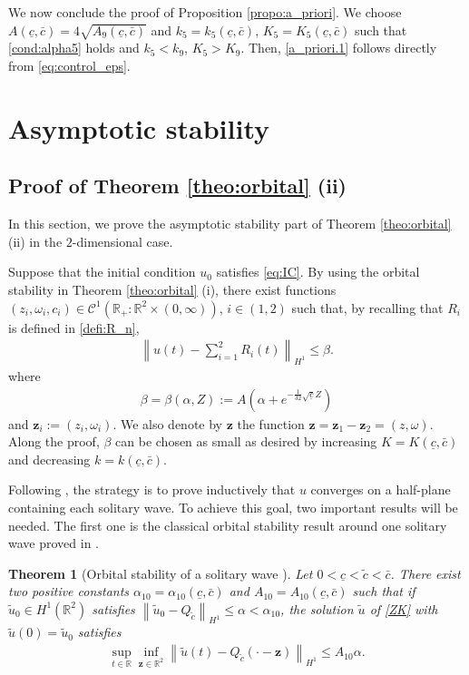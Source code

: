 \documentclass[reqno,10pt]{amsart}
\newtheorem{theo}[lemm]{Theorem}
\numberwithin{equation}{section}
\newcommand{\bz}{\mathbf{z}}
\begin{document}
	We now conclude the proof of Proposition \ref{propo:a_priori}. We choose $A(\underline{c},\bar{c})=4\sqrt{A_9(\underline{c},\bar{c})}$ and $k_5=k_5(\underline{c},\bar{c})$, $K_5=K_5(\underline{c},\bar{c})$ such that \eqref{cond:alpha5} holds and $k_5<k_9$, $K_5>K_9$. Then, \eqref{a_priori.1} follows directly from \eqref{eq:control_eps}.  
	
\section{Asymptotic stability} \label{Sec:asympt}

\subsection{Proof of Theorem \ref{theo:orbital} (ii)}

In this section, we prove the asymptotic stability part of Theorem \ref{theo:orbital} (ii) in the $2$-dimensional case. 
	
	Suppose that the initial condition $u_0$ satisfies \eqref{eq:IC}. By using the orbital stability in Theorem \ref{theo:orbital} (i), there exist functions $(z_i,\omega_i,c_i)\in \mathcal{C}^1(\mathbb{R}_+: \mathbb{R}^2 \times(0,\infty))$, $i\in (1,2)$ such that, by recalling that $R_i$ is defined in \eqref{defi:R_n},
	\begin{align} \label{bound:u(t)}
		\left\| u(t) - \sum_{i=1}^2 R_i(t) \right\|_{H^1} \leq \beta.
	\end{align}
	where
	\begin{align}\label{defi:alpha_star}
		\beta = \beta(\alpha, Z) := A \left( \alpha +e^{-\frac{1}{32} \sqrt{\underline{c}} Z}\right)
	\end{align}
 and $\bz_i := (z_i,\omega_i)$. We also denote by $\bz$ the function $\bz = \bz_1 - \bz_2 = (z,\omega)$. Along the proof, $\beta$ can be chosen as small as desired by increasing $K=K(\underline{c},\bar{c})$ and decreasing $k=k(\underline{c},\bar{c})$. 
 
Following \cite{MMT02}, the strategy is to prove inductively that $u$ converges on a half-plane containing each solitary wave. To achieve this goal, two important results will be needed. The first one is the classical orbital stability result around one solitary wave proved in \cite{deB96}. 
	
	\begin{theo}[Orbital stability of a solitary wave \cite{deB96}]\label{theo:orbital_stab}
		Let $0<\underline{c}<\tilde{c}<\bar{c}$. There exist two positive constants $\alpha_{10}=\alpha_{10}(\underline{c},\bar{c})$ and $A_{10}=A_{10}(\underline{c},\bar{c})$ such that if $\tilde{u}_0\in H^1(\mathbb{R}^2)$ satisfies $\left\| \tilde{u}_0 -Q_{\tilde{c}} \right\|_{H^1} \leq \alpha < \alpha_{10}$, the solution $ \tilde{u}$ of \ref{ZK} with $\tilde{u}(0)=\tilde{u}_0$ satisfies
		\begin{align*}
			\sup_{t \in \mathbb{R}} \inf_{\bz \in \mathbb{R}^2} \left\| \tilde{u}(t) - Q_{\tilde{c}} \left( \cdot- \bz \right) \right\|_{H^1} \leq A_{10} \alpha.
		\end{align*}
	\end{theo}
\end{document}
